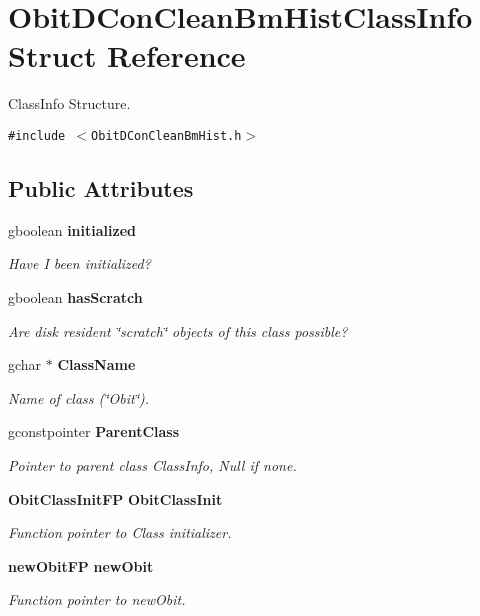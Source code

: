 \section{Obit\-DCon\-Clean\-Bm\-Hist\-Class\-Info Struct Reference}
\label{structObitDConCleanBmHistClassInfo}
Class\-Info Structure.  


{\tt \#include $<$Obit\-DCon\-Clean\-Bm\-Hist.h$>$}

\subsection*{Public Attributes}
\begin{CompactItemize}
\item 
gboolean {\bf initialized}
\begin{CompactList}\small\item\em Have I been initialized? \item\end{CompactList}\item 
gboolean {\bf has\-Scratch}
\begin{CompactList}\small\item\em Are disk resident \char`\"{}scratch\char`\"{} objects of this class possible? \item\end{CompactList}\item 
gchar $\ast$ {\bf Class\-Name}
\begin{CompactList}\small\item\em Name of class (\char`\"{}Obit\char`\"{}). \item\end{CompactList}\item 
gconstpointer {\bf Parent\-Class}
\begin{CompactList}\small\item\em Pointer to parent class Class\-Info, Null if none. \item\end{CompactList}\item 
{\bf Obit\-Class\-Init\-FP} {\bf Obit\-Class\-Init}
\begin{CompactList}\small\item\em Function pointer to Class initializer. \item\end{CompactList}\item 
{\bf new\-Obit\-FP} {\bf new\-Obit}
\begin{CompactList}\small\item\em Function pointer to new\-Obit. \item\end{CompactList}\item 

\end{CompactItemize}
